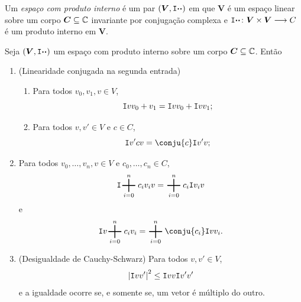 \begin{defi}
Um \emph{espaço com produto interno} é um par $(\bm V,\mathtt I{\bm{\cdot}}{\bm{\cdot}})$ em que $\bm V$ é um espaço linear sobre um corpo $\bm C \subseteq \mathbb{C}$ invariante por conjugação complexa e $\mathtt I{\bm{\cdot}}{\bm{\cdot}}\colon \bm V \times \bm V \longrightarrow C$ é um produto interno em $\bm V$.
\end{defi}

\begin{prop}
Seja $(\bm V,\mathtt I{\bm{\cdot}}{\bm{\cdot}})$ um espaço com produto interno sobre um corpo $\bm C \subseteq \mathbb{C}$. Então
	\begin{enumerate}
	\item (Linearidade conjugada na segunda entrada)
		\begin{enumerate}
		\item Para todos $v_0,v_1,v \in V$,
			\begin{equation*}
			\mathtt I{v}{v_0+v_1} = \mathtt I{v}{v_0} + \mathtt I{v}{v_1};
			\end{equation*}
		\item Para todos $v,v' \in V$ e $c \in C$,
			\begin{equation*}
			\inte{v'}{cv} = \conju{c}\inte{v'}{v};
			\end{equation*}
		\end{enumerate}
	\item Para todos $v_0,\ldots,v_n,v \in V$ e $c_0,\ldots,c_n \in C$,
		\begin{equation*}
		\inte{\sum_{i=0}^n c_iv_i}{v} = \sum_{i=0}^n c_i\inte{v_i}{v}
		\end{equation*}
e
		\begin{equation*}
		\inte{v}{\sum_{i=0}^n c_iv_i} = \sum_{i=0}^n \conju{c_i}\inte{v}{v_i}.
		\end{equation*}
	\item (Desigualdade de Cauchy-Schwarz) Para todos $v,v' \in V$,
		\begin{equation*}
		\left\vert{\mathtt I{v}{v'}}\right\vert^2 \leq \mathtt I{v}{v}\mathtt I{v'}{v'}
		\end{equation*}
		e a igualdade ocorre se, e somente se, um vetor é múltiplo do outro.
		\end{enumerate}
\end{prop}

